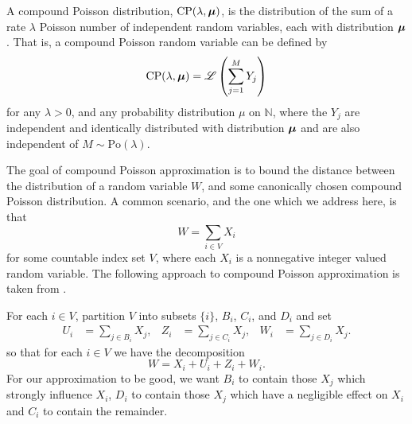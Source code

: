 	A compound Poisson distribution, $\mathrm{CP}(\lambda, {\bm{{\mu}}})$, is the distribution of the sum of a rate $\lambda$ Poisson number of independent random variables, each with distribution ${\bm{{\mu}}}$. That is, a compound Poisson random variable can be defined by
	\begin{equation}
		\mathrm{CP}(\lambda, {\bm{{\mu}}}) = \mathscr{L}\left(\sum_{j=1}^M Y_j\right)
	\end{equation}
	for any $\lambda > 0$, and any probability distribution $\mu$ on $\mathbb{N}$, where the $Y_j$ are independent and identically distributed with distribution ${\bm{{\mu}}}$ and are also independent of $M \sim \mathrm{Po}(\lambda)$.

	The goal of compound Poisson approximation is to bound the distance between the distribution of a random variable $W$, and some canonically chosen compound Poisson distribution. A common scenario, and the one which we address here, is that
	\begin{equation}
		W = \sum_{i \in V} X_i
	\end{equation}
	for some countable index set $V$, where each $X_i$ is a nonnegative integer valued random variable. The following approach to compound Poisson approximation is taken from \cite[Section 2.2]{Barbour2001-nh}.

	For each $i \in V$, partition $V$ into subsets $\{i\}$, $B_i$, $C_i$, and $D_i$ and set 
	\begin{align}
		U_i &= \sum_{j \in B_i} X_j, &
		Z_i &= \sum_{j \in C_i} X_j, &
		W_i &= \sum_{j \in D_i} X_j.
	\end{align}
	so that for each $i \in V$ we have the decomposition 
	\begin{equation}
		W = X_i + U_i + Z_i + W_i.
	\end{equation}
	For our approximation to be good, we want $B_i$ to contain those $X_j$ which strongly influence $X_i$, $D_i$ to contain those $X_j$ which have a negligible effect on $X_i$ and $C_i$ to contain the remainder.

